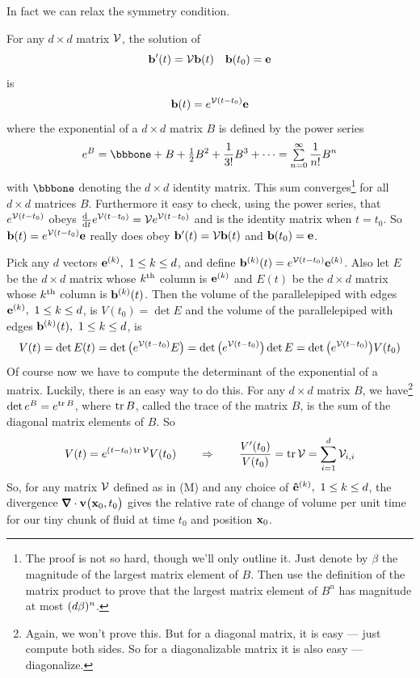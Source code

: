 In fact we can relax the symmetry condition.
\begin{eg}
             \label{eg:flowExpandC}
For any $d\times d$ matrix  $\mathcal{V}$, the solution of 
\begin{equation*}
\mathbf{b}'(t)=\mathcal{V}\mathbf{b}(t)\quad \mathbf{b}(t_0)=\mathbf{e}
\end{equation*}
is
\begin{equation*}
\mathbf{b}(t)=e^{\mathcal{V} (t-t_0)}\mathbf{e}
\end{equation*}
where the exponential of a $d\times d$ matrix $B$ is defined by
the power series
\begin{equation*}
e^B=\bbbone+B+\half B^2+\frac{1}{3!}B^3+\cdots=\smsum_{n=0}^\infty \frac{1}{n!}B^n
\end{equation*}
with $\bbbone$ denoting the $d\times d$ identity matrix.
This sum converges\footnote{The proof is not so hard, though we'll only
outline it. Just denote by $\beta$ the magnitude of the largest matrix 
element of $B$.  Then use the definition of the matrix product to prove that
the largest matrix element of $B^n$ has magnitude at most $(d\beta)^n$.} 
for all $d\times d$ matrices $B$. Furthermore it easy
to check, using the power series, that $e^{\mathcal{V} (t-t_0)}$ 
obeys $\diff{\hfill}{t}e^{\cV (t-t_0)}=\cV e^{\cV (t-t_0)}$ 
and is the identity matrix when $t=t_0$. So 
$\mathbf{b}(t)=e^{\mathcal{V} (t-t_0)}\mathbf{e}$ really does obey 
$\mathbf{b}'(t)=\mathcal{V}\mathbf{b}(t)$ and $\mathbf{b}(t_0)=\mathbf{e}$. 

Pick any $d$ vectors $\mathbf{e}^{(k)},\ 1\le k\le d$, and 
define $\mathbf{b}^{(k)}(t)=e^{\mathcal{V} (t-t_0)}\mathbf{e}^{(k)}$. Also let $E$ be the $d\times d$ matrix
whose $k^{\rm th}$ column is $\mathbf{e}^{(k)}$ and $E(t)$  be the $d\times d$ matrix
whose $k^{\rm th}$ column is $\mathbf{b}^{(k)}(t)$. Then the volume of the parallelepiped
with edges $\mathbf{e}^{(k)},\ 1\le k\le d$, is $V(t_0)=\det E$ and the volume of the 
parallelepiped with edges $\mathbf{b}^{(k)}(t),\ 1\le k\le d$, is 
\begin{equation*}
V(t)=\det E(t)=\det\big(e^{\mathcal{V} (t-t_0)}E\big)
=\det\big(e^{\mathcal{V} (t-t_0)}\big)\det E
=\det\big(e^{\mathcal{V} (t-t_0)}\big)V(t_0)
\end{equation*}
Of course now we have to compute the determinant of the exponential of a matrix.
Luckily, there is an easy way to do this.
For any $d\times d$ matrix $B$, we have\footnote{Again, we won't prove this. 
But for a diagonal matrix, it is easy --- just compute both sides. So for 
a diagonalizable matrix it is also easy --- diagonalize.}
$\det e^B=e^{\mathop{\rm tr} B}$, where $\mathop{\rm tr} B$, called the trace of the matrix $B$, is the sum of the diagonal matrix elements of $B$. So 
\begin{equation*}
V(t)=e^{(t-t_0)\mathop{\rm tr} \mathcal{V} }V(t_0)\qquad\Rightarrow\qquad
\frac{V'(t_0)}{V(t_0)}=\mathop{\rm tr} \mathcal{V}=\sum_{i=1}^d \mathcal{V}_{i,i}
\end{equation*}
So, for any matrix $\mathcal{V}$ defined as in (M)  and any choice of 
$\mathbf{\hat e}^{(k)},\ 1\le k\le d$, the divergence 
$\vnabla\cdot\vv\big(\vx_0,t_0\big)$ gives the relative rate of change
of volume per unit time for our tiny chunk of fluid at time $t_0$ and position
$\mathbf{x}_0$.
\end{eg}

